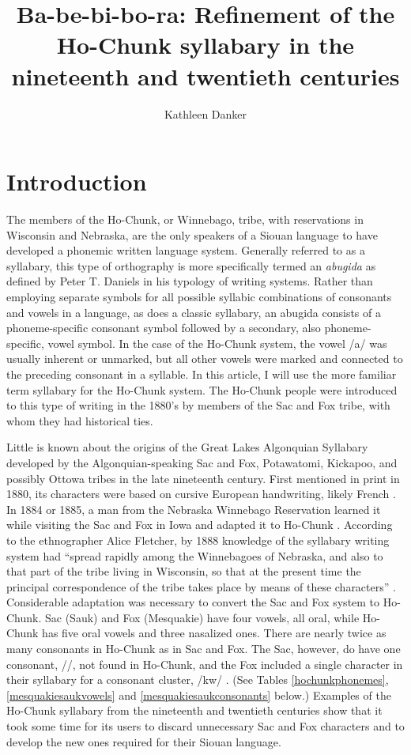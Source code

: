 \documentclass[output=paper]{LSP/langsci}
\author{Kathleen Danker}
\title{Ba-be-bi-bo-ra: Refinement of the Ho-Chunk syllabary in the nineteenth and twentieth centuries}
\begin{document}
\section{Introduction}
The members of the Ho-Chunk, or Winnebago, tribe, with reservations in Wisconsin and Nebraska, are the only speakers of a Siouan language to have developed a phonemic written language system. Generally referred to as a syllabary, this type of orthography is more specifically termed an \emph{abugida} as defined by Peter T. Daniels in his \citeyear{Daniels1990} typology of writing systems. Rather than employing separate symbols for all possible syllabic combinations of consonants and vowels in a language, as does a classic syllabary, an abugida consists of a phoneme-specific consonant symbol followed by a secondary, also phoneme-specific, vowel symbol. In the case of the Ho-Chunk system, the vowel /a/ was usually inherent or unmarked, but all other vowels were marked and connected to the preceding consonant in a syllable. In this article, I will use the more familiar term syllabary for the Ho-Chunk system. The Ho-Chunk people were introduced to this type of writing in the 1880's by members of the Sac and Fox tribe, with whom they had historical ties. 

Little is known about the origins of the Great Lakes Algonquian Syllabary developed by the Algonquian-speaking Sac and Fox, Potawatomi, Kickapoo, and possibly Ottowa tribes in the late nineteenth century. First mentioned in print in 1880, its characters were based on cursive European handwriting, likely French \citep[169]{Walker1996}.  In 1884 or 1885, a man from the Nebraska Winnebago Reservation learned it while visiting the Sac and Fox in Iowa and adapted it to Ho-Chunk \citep[354]{Fletcher1890b}. According to the ethnographer Alice Fletcher, by 1888 knowledge of the syllabary writing system had ``spread rapidly among the Winnebagoes of Nebraska, and also to that part of the tribe living in Wisconsin, so that at the present time the principal correspondence of the tribe takes place by means of these characters'' \citeyearpar[299]{Fletcher1890a}. Considerable adaptation was necessary to convert the Sac and Fox system to Ho-Chunk. Sac (Sauk) and Fox (Mesquakie) have four vowels, all oral, while Ho-Chunk has five oral vowels and three nasalized ones. There are nearly twice as many consonants in Ho-Chunk as in Sac and Fox. The Sac, however, do have one consonant, //, not found in Ho-Chunk, and the Fox included a single character in their syllabary for a consonant cluster, /kw/ \citep{Jones1906}. (See Tables \ref{hochunkphonemes}, \ref{mesquakiesaukvowels} and \ref{mesquakiesaukconsonants} below.) Examples of the Ho-Chunk syllabary from the nineteenth and twentieth centuries show that it took some time for its users to discard unnecessary Sac and Fox characters and to develop the new ones required for their Siouan language. 
\end{document}
